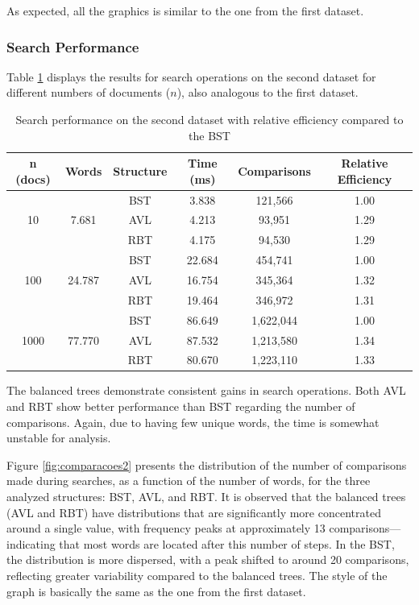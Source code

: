 As expected, all the graphics is similar to the one from the first dataset.

 \subsubsection{Search Performance}

 Table \ref{tab:busca_db2} displays the results for search operations on the second dataset for different numbers
 of documents ($n$), also analogous to the first dataset.

 \begin{table}[H]
     \centering
     \begin{tabular}{|c|c|c|c|c|c|}
     \hline
     \textbf{n (docs)} & \textbf{Words} & \textbf{Structure} & \textbf{Time (ms)} & \textbf{Comparisons} & \textbf{Relative Efficiency} \\
     \hline
     \multirow{3}{*}{10} & \multirow{3}{*}{7.681} & BST & 3.838 & 121,566 & 1.00 \\
     & & AVL & 4.213 & 93,951 & 1.29 \\
     & & RBT & 4.175 & 94,530 & 1.29 \\
     \hline
     \multirow{3}{*}{100} & \multirow{3}{*}{24.787} & BST & 22.684 & 454,741 & 1.00 \\
     & & AVL & 16.754 & 345,364 & 1.32 \\
     & & RBT & 19.464 & 346,972 & 1.31 \\
     \hline
     \multirow{3}{*}{1000} & \multirow{3}{*}{77.770} & BST & 86.649 & 1,622,044 & 1.00 \\
     & & AVL & 87.532 & 1,213,580 & 1.34 \\
     & & RBT & 80.670 & 1,223,110 & 1.33 \\
     \hline
     \end{tabular}
     \caption{Search performance on the second dataset with relative efficiency compared to the BST}
     \label{tab:busca_db2}
 \end{table}

 The balanced trees demonstrate consistent gains in search operations.
 Both AVL and RBT show better performance than BST regarding the number
 of comparisons. Again, due to having few unique words, the time is somewhat unstable for
 analysis.

Figure \ref{fig:comparacoes2} presents the distribution of the number of comparisons made
 during searches, as a function of the number of words, for the three analyzed structures:
 BST, AVL, and RBT. It is observed that the balanced trees (AVL and RBT) have distributions
 that are significantly more concentrated around a single value, with frequency peaks at
 approximately 13 comparisons—indicating that most words are located after this
 number of steps. In the BST, the distribution is more dispersed, with a peak
 shifted to around 20 comparisons, reflecting greater variability compared to the balanced trees.
 The style of the graph is basically the same as the one from the first dataset.


